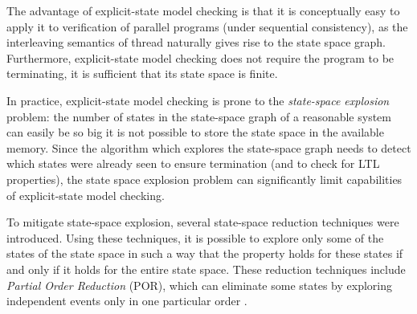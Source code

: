 The advantage of explicit-state model checking is that it is conceptually easy
to apply it to verification of parallel programs (under sequential
consistency), as the interleaving semantics of thread naturally gives rise to
the state space graph.
Furthermore, explicit-state model checking does not require the program to be terminating, it is sufficient that its state space is finite.

In practice, explicit-state model checking is prone to the \emph{state-space
explosion} problem: the number of states in the state-space graph of a
reasonable system can easily be so big it is not possible to store the state
space in the available memory.
Since the algorithm which explores the state-space graph needs to detect which
states were already seen to ensure termination (and to check for LTL
properties), the state space explosion problem can significantly limit
capabilities of explicit-state model checking.

To mitigate state-space explosion, several state-space reduction techniques
were introduced.
Using these techniques, it is possible to explore only some of the states of
the state space in such a way that the property holds for these states if and
only if it holds for the entire state space.
These reduction techniques include \emph{Partial Order Reduction} (POR), which
can eliminate some states by exploring independent events only in one
particular order \cite{Peled1993,Godefroid1996partial,TODO}.

